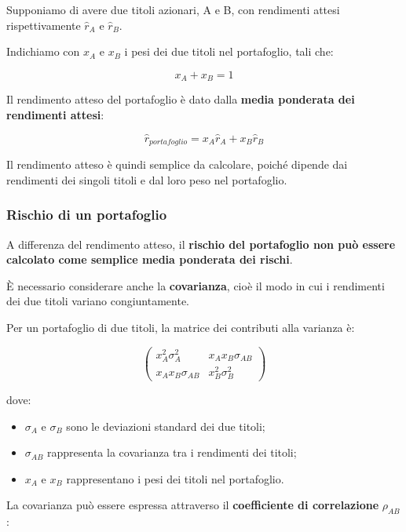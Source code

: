 \noindent Supponiamo di avere due titoli azionari,
A e B, con rendimenti attesi rispettivamente
$\hat{r}_A$ e $\hat{r}_B$.

\medskip

\noindent Indichiamo con $x_A$ e $x_B$ i pesi
dei due titoli nel portafoglio, tali che:

\[
x_A+x_B=1
\]

\noindent Il rendimento atteso del portafoglio
è dato dalla \textbf{media ponderata dei rendimenti attesi}:

\[
\boxed{
\hat{r}_{portafoglio}
=x_A\hat{r}_A+x_B\hat{r}_B
}
\]

\noindent Il rendimento atteso è quindi semplice da calcolare,
poiché dipende dai rendimenti dei singoli titoli
e dal loro peso nel portafoglio.


\subsubsection*{Rischio di un portafoglio}

\noindent A differenza del rendimento atteso,
il \textbf{rischio del portafoglio non può essere
calcolato come semplice media ponderata dei rischi}.

\medskip

\noindent È necessario considerare anche la
\textbf{covarianza}, cioè il modo in cui
i rendimenti dei due titoli variano congiuntamente.

\medskip

\noindent Per un portafoglio di due titoli,
la matrice dei contributi alla varianza è:

\[
\begin{pmatrix}
x_A^2\sigma_A^2 &
x_Ax_B\sigma_{AB} \\[2mm]
x_Ax_B\sigma_{AB} &
x_B^2\sigma_B^2
\end{pmatrix}
\]

\noindent dove:

\begin{itemize}
    \item $\sigma_A$ e $\sigma_B$ sono le deviazioni standard
    dei due titoli;
    \item $\sigma_{AB}$ rappresenta la covarianza
    tra i rendimenti dei titoli;
    \item $x_A$ e $x_B$ rappresentano i pesi
    dei titoli nel portafoglio.
\end{itemize}

\noindent La covarianza può essere espressa attraverso
il \textbf{coefficiente di correlazione} $\rho_{AB}$:

